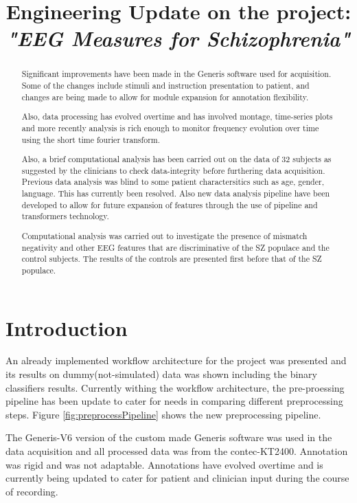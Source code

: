 \documentclass[conference]{IEEEconf}
\title{Engineering Update on the project: \textit{\textbf{"EEG Measures for Schizophrenia"}}}
\begin{document}
\maketitle


\begin{abstract}
  Significant improvements have been made in the Generis software used for acquisition. Some of the changes include stimuli and instruction presentation to patient, and
  changes are being made to allow for module expansion for annotation flexibility.

  Also, data processing has evolved overtime and has involved montage, time-series plots and more recently analysis is rich enough to monitor frequency evolution over time using the
  short time fourier transform.

  Also, a brief computational analysis has been carried out on the data of 32 subjects as suggested by the clinicians to check data-integrity before furthering data acquisition. 
  Previous data analysis was blind to some patient charactersitics such as age, gender, language. This has currently been resolved. Also new data analysis pipeline 
  have been developed to allow for future expansion of features through the use of pipeline and transformers technology.

  Computational analysis was carried out to investigate the presence of mismatch negativity and other EEG features that are discriminative of the SZ populace and the control subjects.
  The results of the controls are presented first before that of the SZ populace.
\end{abstract}

\section{Introduction}\label{sec:intro}
An already implemented workflow architecture for the project was presented and its results on dummy(not-simulated) data was shown 
including the binary classifiers results. Currently withing the workflow architecture, the pre-proessing pipeline
has been update to cater for needs in comparing different preprocessing steps. Figure \ref{fig:preprocessPipeline} shows the 
new preprocessing pipeline.

The Generis-V6 version of the custom made Generis software was used in the data acquisition and all processed data was from the contec-KT2400.
Annotation was rigid and was not adaptable. Annotations have evolved overtime and is currently being updated to cater for patient 
and clinician input during the course of recording.
\end{document}
